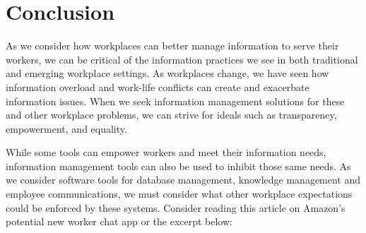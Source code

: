 \documentclass[
  letterpaper,
  DIV=11,
  numbers=noendperiod]{scrreprt}
\begin{document}
\section{Conclusion}\label{conclusion-2}

As we consider how workplaces can better manage information to serve
their workers, we can be critical of the information practices we see in
both traditional and emerging workplace settings. As workplaces change,
we have seen how information overload and work-life conflicts can create
and exacerbate information issues. When we seek information management
solutions for these and other workplace problems, we can strive for
ideals such as transparency, empowerment, and equality.

While some tools can empower workers and meet their information needs,
information management tools can also be used to inhibit those same
needs. As we consider software tools for database management, knowledge
management and employee communications, we must consider what other
workplace expectations could be enforced by these systems. Consider
reading this article on Amazon's potential new worker chat app or the
excerpt below:
\end{document}
